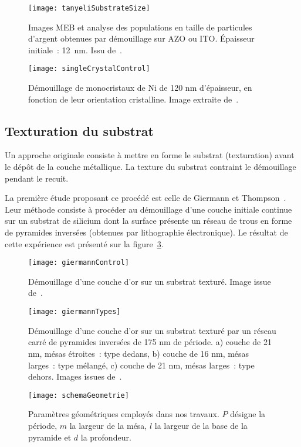 \begin{figure}[!htb]
	\centering
	\texttt{[image: tanyeliSubstrateSize]}
	\caption{Images MEB et analyse des populations en taille de particules d'argent obtenues par démouillage sur AZO ou ITO. Épaisseur initiale~: 12~nm. Issu de~\cite{tanyeli2013effect}.}
	\label{tanyeliSubstrateSize}
\end{figure} 
\begin{figure}[!htb]
	\centering
	\texttt{[image: singleCrystalControl]}
	\caption{Démouillage de monocristaux de Ni de 120 nm d'épaisseur, en fonction de leur orientation cristalline. Image extraite de~\cite{ye2011templated}.}
	\label{singleCrystalControl}
\end{figure} 

	\subsection{Texturation du substrat}
	\label{sControleBiblio}
Un approche originale consiste à mettre en forme le substrat (texturation) avant le dépôt de la couche métallique. La texture du substrat contraint le démouillage pendant le recuit.\par  
La première étude proposant ce procédé est celle de Giermann et Thompson~\cite{giermann2005solid, giermann2011requirements}. Leur méthode consiste à procéder au démouillage d'une couche initiale continue sur un substrat de silicium dont la surface présente un réseau de trous en forme de pyramides inversées (obtenues par lithographie électronique). Le résultat de cette expérience est présenté sur la figure~\ref{giermannControl}.
\begin{figure}[!htb]
	\centering
	\texttt{[image: giermannControl]}
	\caption{Démouillage d'une couche d'or sur un substrat texturé. Image issue de~\cite{giermann2005solid}.}
	\label{giermannControl}
\end{figure} 
\begin{figure}[!htb]
	\centering
	\texttt{[image: giermannTypes]}
	\caption{Démouillage d'une couche d'or sur un substrat texturé par un réseau carré de pyramides inversées de 175 nm de période. a) couche de 21 nm, mésas étroites~: type \og dedans\fg, b) couche de 16 nm, mésas larges~: type \og mélangé\fg, c) couche de 21 nm, mésas larges~: type \og dehors\fg. Images issues de~\cite{giermann2011requirements}.}
	\label{giermannTypes}
\end{figure} 
\begin{figure}[!htb]
	\centering
	\texttt{[image: schemaGeometrie]}
	\caption{Paramètres géométriques employés dans nos travaux. $P$ désigne la période, $m$ la largeur de la mésa, $l$ la largeur de la base de la pyramide et $d$ la profondeur.}
	\label{schemaGeometrie}
\end{figure} 
